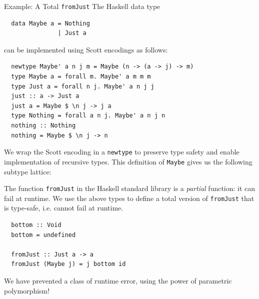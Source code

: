 \documentclass[final]{beamer}
\begin{document}
\begin{frame}[fragile]
\begin{columns}[t]
\begin{column}{.33\textwidth}
\begin{block}{Example: A Total \texttt{fromJust}}
\vspace{0.5cm}
The Haskell data type

\begin{verbatim}
  data Maybe a = Nothing
               | Just a
\end{verbatim}

can be implemented using Scott encodings as follows:

\begin{verbatim}
  newtype Maybe' a n j m = Maybe (n -> (a -> j) -> m)
  type Maybe a = forall m. Maybe' a m m m 
  type Just a = forall n j. Maybe' a n j j
  just :: a -> Just a
  just a = Maybe $ \n j -> j a
  type Nothing = forall a n j. Maybe' a n j n
  nothing :: Nothing
  nothing = Maybe $ \n j -> n
\end{verbatim}

We wrap the Scott encoding in a \texttt{newtype} to preserve type safety and
enable implementation of recursive types. This definition of \texttt{Maybe}
gives us the following subtype lattice:

\begin{figure}[!h]
\centering
{}
\end{figure}

The function \texttt{fromJust} in the Haskell standard library is a
\emph{partial} function: it can fail at runtime. We use the above types to
define a total version of \texttt{fromJust} that is type-safe, i.e. cannot
fail at runtime.

\begin{verbatim}
  bottom :: Void
  bottom = undefined

  fromJust :: Just a -> a
  fromJust (Maybe j) = j bottom id 
\end{verbatim}

We have prevented a class of runtime error, using the power of parametric
polymorphism!

\end{block}


\end{column}
\end{columns}
\end{frame}
\end{document}
